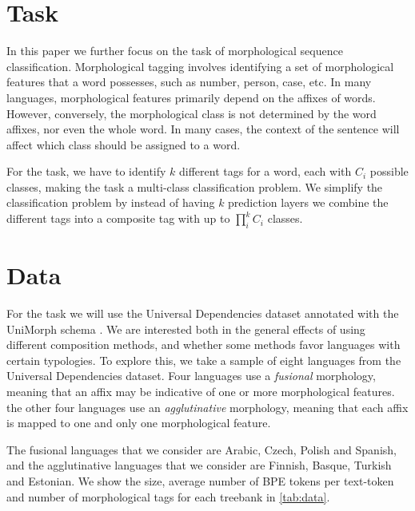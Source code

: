 \documentclass[11pt]{article}
\newcommand\jp[1]{(\textbf{JP:} #1)}
\newcommand\citep{\cite}
\begin{document}
    \section{Task}
             In this paper we further focus on the task of
     morphological sequence classification. Morphological tagging
     involves identifying a set of morphological features that a word
     possesses, such as number, person, case, etc. In many languages,
     morphological features primarily depend on the affixes of
     words. However, conversely, the morphological class is not
     determined by the word affixes, nor even the whole word. In many
     cases, the context of the sentence will affect which class should
     be assigned to a word.

     For the task, we have to identify $k$ different tags for a word,
     each with $C_i$ possible classes, making the task a multi-class
     classification problem. We simplify the classification problem by
     instead of having $k$ prediction layers we combine the different
     tags into a composite tag with up to $\prod _i^k C_i$ classes.

    \section{Data}
    
            For the task we will use the Universal Dependencies
     dataset \citep{nivre2018} annotated with the UniMorph schema
     \citep{mccarthy2018marrying}. We are interested both in the
     general effects of using different composition methods, and
     whether some methods favor languages with certain typologies. To
     explore this, we take a sample of eight languages from the
     Universal Dependencies dataset. Four languages use a
     \textit{fusional} morphology, meaning that an affix may be
     indicative of one or more morphological features. the other four
     languages use an \textit{agglutinative} morphology, meaning that
     each affix is mapped to one and only one morphological feature.

    
           	The fusional languages that we consider are Arabic, Czech,
     Polish and Spanish, and the agglutinative languages that we
     consider are Finnish, Basque, Turkish and Estonian.  We show the
     size, average number of BPE tokens per text-token and number of
     morphological tags for each treebank in \cref{tab:data}.
    
\end{document}
